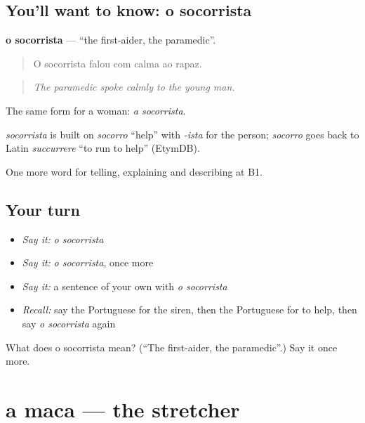 \subsection*{You'll want to know: o socorrista}
\textbf{o socorrista} — \textquotedblleft{}the first-aider, the paramedic\textquotedblright{}.

\begin{quote}
O socorrista falou com calma ao rapaz.
\end{quote}

\begin{quote}
\emph{The paramedic spoke calmly to the young man.}
\end{quote}

The same form for a woman: \emph{a socorrista}.

\begin{cousinweb}
\emph{socorrista} is built on \emph{socorro} \textquotedblleft{}help\textquotedblright{} with \emph{-ista} for the person; \emph{socorro} goes back to Latin \emph{succurrere} \textquotedblleft{}to run to help\textquotedblright{} (EtymDB).
\end{cousinweb}

\begin{grammarlens}[title={What you've built}]
One more word for telling, explaining and describing at B1.
\end{grammarlens}

\subsection*{Your turn}
\begin{itemize}
\raggedright
  \item \emph{Say it:} \emph{o socorrista}
  \item \emph{Say it:} \emph{o socorrista}, once more
  \item \emph{Say it:} a sentence of your own with \emph{o socorrista}
  \item \emph{Recall:} say the Portuguese for the siren, then the Portuguese for to help, then say \emph{o socorrista} again
\end{itemize}

\begin{tcolorbox}[breakable,colback=teal!4,colframe=teal!35!black,title={Before you move on}]
What does o socorrista mean? (\textquotedblleft{}The first-aider, the paramedic\textquotedblright{}.) Say it once more.
\end{tcolorbox}
\section[a maca]{a maca — the stretcher}

